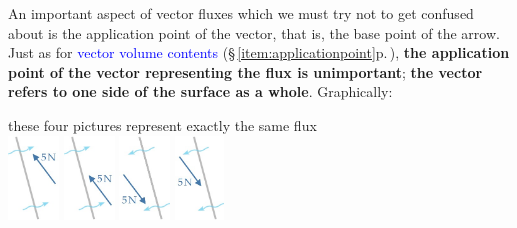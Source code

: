\documentclass[a4paper,12pt,%
onecolumn,oneside,%
british%
]{memoir}
\renewcommand*{\|}[1][]{\nonscript\:#1\vert\nonscript\:\mathopen{}}
\newcommand*{\sect}{\S}%
\renewcommand*{\autoref}[3][\sect\,\ref]{\textcolor{blue}{#3} {\color{blue}\scriptsize(\faIcon[regular]{eye}\;#1{#2}\;p.\,\pageref{#2})}}
\begin{document}
\medskip

An important aspect of vector fluxes which we must try not to get confused about is the application point of the vector, that is, the base point of the arrow. Just as for \autoref{item:applicationpoint}{vector volume contents}, \textbf{the application point of the vector representing the flux is unimportant}; \textbf{the vector refers to one side of the surface as a whole}. Graphically:\noprelistbreak
\begin{center}\label{fig:vector_fluxes_position_unimportant}
  \bigskip
these four pictures represent exactly the same flux\noprelistbreak
\\[1ex]
\hspace*{\fill}
\includegraphics[height=6em]{images/vflux_pos1.jpg}
\hfill
\includegraphics[height=6em]{images/vflux_pos2.jpg}
\hfill
\includegraphics[height=6em]{images/vflux_pos3.jpg}
\hfill
\includegraphics[height=6em]{images/vflux_pos4.jpg}
\hspace*{\fill}\mbox{}
\end{center}

\medskip
\end{document}
